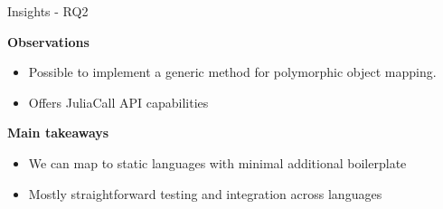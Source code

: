 \begin{frame}{Insights - RQ2}
    
    \textbf{Observations}
    \begin{itemize}
      \item Possible to implement a generic method for polymorphic object mapping.
      \item Offers JuliaCall API capabilities 
    \end{itemize}
    \pause
    \textbf{Main takeaways}
    \begin{itemize}
      \item We can map to static languages with minimal additional boilerplate
      \item Mostly straightforward testing and integration across languages
    \end{itemize}
    \end{frame}
    